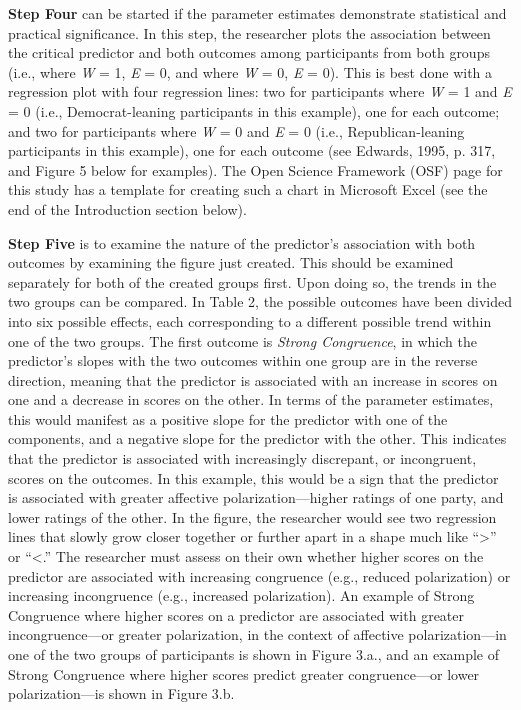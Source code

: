 \documentclass[authordate, meta]{jote-new-article}
\begin{document}
	\textbf{Step Four }can be started if the parameter estimates demonstrate statistical and practical significance. In this step, the researcher plots the association between the critical predictor and both outcomes among participants from both groups (i.e., where \emph{W} = 1, \emph{E} = 0, and where \emph{W} = 0, \emph{E} = 0). This is best done with a regression plot with four regression lines: two for participants where \emph{W} = 1 and \emph{E} = 0 (i.e., Democrat-leaning participants in this example), one for each outcome; and two for participants where \emph{W} = 0 and \emph{E} = 0 (i.e., Republican-leaning participants in this example), one for each outcome (see Edwards, 1995, p. 317, and Figure 5 below for examples). The Open Science Framework (OSF) page for this study has a template for creating such a chart in Microsoft Excel (see the end of the Introduction section below).



	\textbf{Step Five }is to examine the nature of the predictor's association with both outcomes by examining the figure just created. This should be examined separately for both of the created groups first. Upon doing so, the trends in the two groups can be compared. In Table 2, the possible outcomes have been divided into six possible effects, each corresponding to a different possible trend within one of the two groups. The first outcome is \emph{Strong Congruence}, in which the predictor's slopes with the two outcomes within one group are in the reverse direction, meaning that the predictor is associated with an increase in scores on one and a decrease in scores on the other. In terms of the parameter estimates, this would manifest as a positive slope for the predictor with one of the components, and a negative slope for the predictor with the other. This indicates that the predictor is associated with increasingly discrepant, or incongruent, scores on the outcomes. In this example, this would be a sign that the predictor is associated with greater affective polarization—higher ratings of one party, and lower ratings of the other. In the figure, the researcher would see two regression lines that slowly grow closer together or further apart in a shape much like “>” or “<.” The researcher must assess on their own whether higher scores on the predictor are associated with increasing congruence (e.g., reduced polarization) or increasing incongruence (e.g., increased polarization). An example of Strong Congruence where higher scores on a predictor are associated with greater incongruence—or greater polarization, in the context of affective polarization—in one of the two groups of participants is shown in Figure 3.a., and an example of Strong Congruence where higher scores predict greater congruence—or lower polarization—is shown in Figure 3.b.
\end{document}
